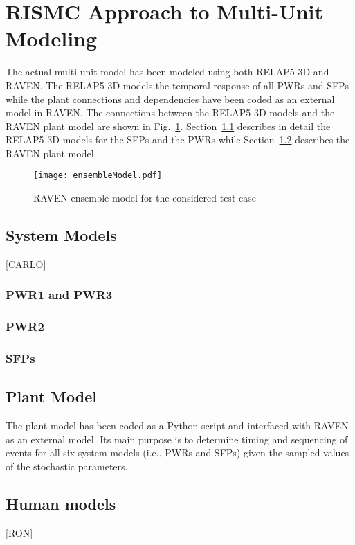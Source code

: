 \section{RISMC Approach to Multi-Unit Modeling}
\label{sec:RISMC_MU_modeling}

The actual multi-unit model has been modeled using both RELAP5-3D and RAVEN.
The RELAP5-3D models the temporal response of all PWRs and SFPs while the plant 
connections and dependencies have been coded as an external model in RAVEN.
The connections between the RELAP5-3D models and the RAVEN plant model are 
shown in Fig.~\ref{fig:ensembleModel}.
Section~\ref{sec:systemModels} describes in detail the RELAP5-3D models for 
the SFPs and the PWRs while Section~\ref{sec:plantModel} describes the RAVEN plant model.
 
\begin{figure}
    \centering
    \texttt{[image: ensembleModel.pdf]}
    \caption{RAVEN ensemble model for the considered test case}
    \label{fig:ensembleModel}
\end{figure}

\subsection{System Models}
\label{sec:systemModels}
[CARLO]
\subsubsection{PWR1 and PWR3}

\subsubsection{PWR2}

\subsubsection{SFPs}

\subsection{Plant Model}
\label{sec:plantModel}
The plant model has been coded as a Python script and interfaced with RAVEN as an 
external model. Its main purpose is to determine timing and sequencing of events 
for all six system models (i.e., PWRs and SFPs) given the sampled values of the 
stochastic parameters.

\subsection{Human models}
[RON]

